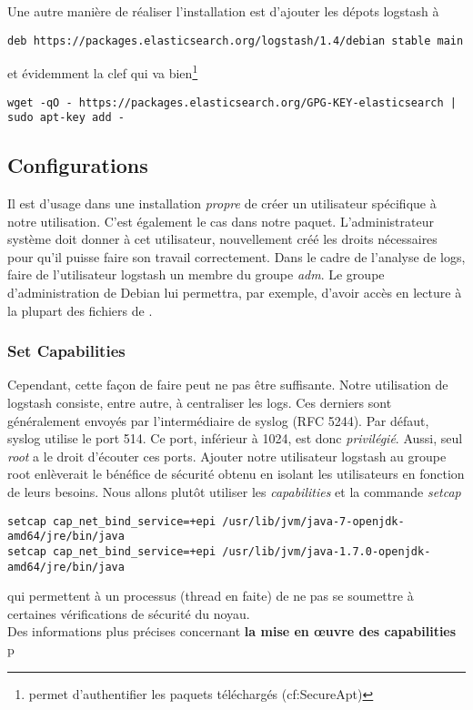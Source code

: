 Une autre manière de réaliser l'installation est d'ajouter les dépots logstash à 

\begin{lstlisting}[style=code,label={lst:ajoutdepotlogstash}]
deb https://packages.elasticsearch.org/logstash/1.4/debian stable main
\end{lstlisting}

et évidemment la clef qui va bien\footnote{permet d'authentifier les paquets téléchargés
(cf:SecureApt)}

\begin{lstlisting}[style=code,label={lst:ajoutclefdepotlogstash}]
wget -qO - https://packages.elasticsearch.org/GPG-KEY-elasticsearch | sudo apt-key add -
\end{lstlisting}

\subsection{Configurations}
Il est d'usage dans une installation \textit{propre} de créer un utilisateur spécifique
à notre utilisation. C'est également le cas dans notre paquet. L'administrateur 
système doit donner à cet utilisateur, nouvellement créé les droits nécessaires 
pour qu'il puisse faire son travail correctement. Dans le cadre de 
l'analyse de logs, faire de l'utilisateur logstash un membre du groupe \emph{adm}. 
Le groupe d'administration de Debian lui permettra, par exemple, d'avoir accès en 
lecture à la plupart des fichiers de .

\subsubsection{Set Capabilities}
Cependant, cette façon de faire peut ne pas être suffisante.
Notre utilisation de logstash consiste, entre autre, à centraliser les \gls{logs}. 
Ces derniers sont généralement envoyés par l'intermédiaire de syslog (RFC 5244).
Par défaut, syslog utilise le port 514. Ce port, inférieur à 1024, est donc \textit{privilégié}.
Aussi, seul \emph{root} a le droit d'écouter ces ports. Ajouter notre utilisateur 
logstash au groupe root enlèverait le bénéfice de sécurité obtenu en isolant les 
utilisateurs en fonction de leurs besoins. Nous allons plutôt utiliser les 
\emph{capabilities} 
et la commande \emph{setcap}
\begin{lstlisting}[style=code,label={lst:setcapabilities}]
setcap cap_net_bind_service=+epi /usr/lib/jvm/java-7-openjdk-amd64/jre/bin/java
setcap cap_net_bind_service=+epi /usr/lib/jvm/java-1.7.0-openjdk-amd64/jre/bin/java
\end{lstlisting}
qui permettent à un processus (thread en faite) de ne pas se soumettre à certaines 
vérifications de sécurité du noyau.\\[2mm]
Des informations plus précises concernant \textbf{la mise en œuvre des capabilities}
p\pageref{subsec:logstashcapabilities}

